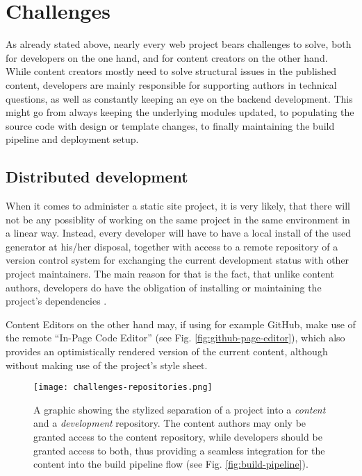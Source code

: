 \section{Challenges}
\label{sec:challenges}

As already stated above, nearly every web project bears challenges to solve, both for developers on the one hand, and for content creators on the other hand. While content creators mostly need to solve structural issues in the published content, developers are mainly responsible for supporting authors in technical questions, as well as constantly keeping an eye on the backend development. This might go from always keeping the underlying modules updated, to populating the source code with design or template changes, to finally maintaining the build pipeline and deployment setup.

\subsection{Distributed development}
\label{sec:challenges-distributeddevelopment}

When it comes to administer a static site project, it is very likely, that there will not be any possiblity of working on the same project in the same environment in a linear way. Instead, every developer will have to have a local install of the used generator at his/her disposal, together with access to a remote repository of a version control system for exchanging the current development status with other project maintainers. The main reason for that is the fact, that unlike content authors, developers do have the obligation of installing or maintaining the project's dependencies \cite[85]{dhillon2016}.

Content Editors on the other hand may, if using for example GitHub, make use of the remote ``In-Page Code Editor'' (see Fig. \ref{fig:github-page-editor}), which also provides an optimistically rendered version of the current content, although without making use of the project's style sheet.
\begin{figure} %
    \centering
    \texttt{[image: challenges-repositories.png]}
    \caption{A graphic showing the stylized separation of a project into a \emph{content} and a \emph{development} repository. The content authors may only be granted access to the content repository, while developers should be granted access to both, thus providing a seamless integration for the content into the build pipeline flow (see Fig. \ref{fig:build-pipeline}).}
    \label{fig:repository-separation}
\end{figure}
%

